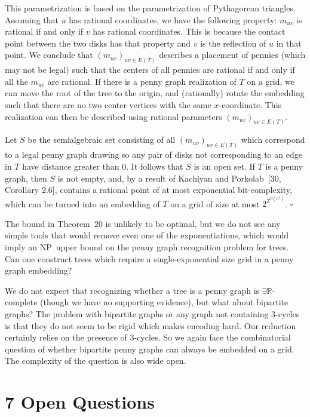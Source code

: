 \documentclass{article}
\begin{document}
   
This parametrization is based on the parametrization of Pythagorean triangles. Assuming that $u$ has rational coordinates, we have the following property: $m_{uv}$ is rational if and only if $v$ has rational coordinates. This is because the contact point between the two disks has that property and $v$ is the reflection of $u$ in that point. We conclude that $(m_{uv})_{uv \in E(T)}$ describes a placement of pennies (which may not be legal) such that the centers of all pennies are rational if and only if all the $m_{uv}$ are rational. If there is a penny graph realization of $T$ on a grid, we can move the root of the tree to the origin, and (rationally) rotate the embedding such that there are no two center vertices with the same $x$-coordinate. This realization can then be described using rational parameters $(m_{uv})_{uv \in E(T)}$.

Let $S$ be the semialgebraic set consisting of all $(m_{uv})_{uv \in E(T)}$ which correspond to a legal penny graph drawing so any pair of disks not corresponding to an edge in $T$ have distance greater than $0$. It follows that $S$ is an open set. If $T$ is a penny graph, then $S$ is not empty, and, by a result of Kachiyan and Porkolab~[30, Corollary 2.6], contains a rational point of at most exponential bit-complexity, which can be turned into an embedding of $T$ on a grid of size at most $2^{2^{O(n^k)}}$.
\hfill$\square$\par\medskip

The bound in Theorem~20 is unlikely to be optimal, but we do not see any simple tools that would remove even one of the exponentiations, which would imply an \textsf{NP}\ upper bound on the penny graph recognition problem for trees. Can one construct trees  which require a single-exponential size grid in a penny graph embedding?

We do not expect that recognizing whether a tree is a penny graph is \ensuremath{\exists\mathbb{R}}-complete (though we have no supporting evidence), but what about bipartite graphs? The problem with bipartite graphs or any graph not containing $3$-cycles is that they do not seem to be rigid
which makes encoding hard. Our reduction certainly relies on the presence of $3$-cycles. So we again face the combinatorial question of whether bipartite penny graphs can always be embedded on a grid. The complexity of the question is also wide open.

\section*{7 Open Questions}
\end{document}
